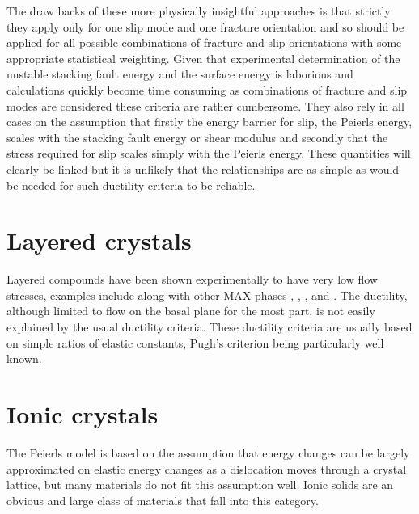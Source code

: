 The draw backs of these more physically insightful approaches is that strictly they apply only for one slip mode and one fracture orientation and so should be applied for all possible combinations of fracture and slip orientations with some appropriate statistical  weighting. Given that experimental determination of the unstable stacking fault energy and the surface energy is laborious and calculations quickly become time consuming as combinations of fracture and slip modes are considered these criteria are rather cumbersome. They also rely in all cases on the assumption that firstly the energy barrier for slip, the Peierls energy, scales with the stacking fault energy or shear modulus and secondly that the stress required for slip scales simply with the Peierls energy. These quantities will clearly be linked but it is unlikely that the relationships are as simple as would be needed for such ductility criteria to be reliable.










\newpage

\section{Layered crystals}




Layered compounds have been shown experimentally to have very low flow stresses, examples include  along with other MAX phases \cite{Barsoum2011},  \cite{Korte2012NbCo},  \cite{Telle2006},  and  \cite{Sygnatowicz2015}. The ductility, although limited to flow on the basal plane for the most part, is not easily explained by the usual ductility criteria. These ductility criteria are usually based on simple ratios of elastic constants, Pugh's criterion being particularly well known.



\newpage


\FloatBarrier
\section{Ionic crystals}

The Peierls model is based on the assumption that energy changes can be largely approximated on elastic energy changes as a dislocation moves through a crystal lattice, but many materials do not fit this assumption well. Ionic solids are an obvious and large class of materials that fall into this category.

